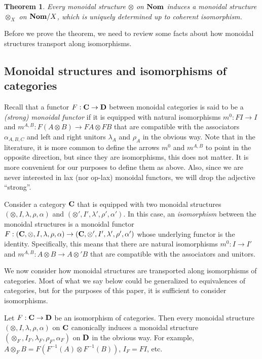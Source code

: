 \documentclass[11pt,a4paper]{amsart}
\theoremstyle{plain}
\newtheorem{xtheorem}{Theorem}[section]
\theoremstyle{definition}
\theoremstyle{remark}
\newcommand{\Nom}{\textrm{\bf Nom}}
\newcommand{\Cc}{\textrm{\bf{C}}}
\newcommand{\Dd}{\textrm{\bf{D}}}
\newcommand{\mm}{m}
\newcommand{\inv}{^{-1}}
\begin{document}
\begin{xtheorem}\label{thm:monoidal-nom-slash-x}
    Every monoidal structure $\otimes$ on $\Nom$ induces a
    monoidal structure $\otimes_X$ on $\Nom/X$, which is uniquely determined up to coherent isomorphism.
\end{xtheorem}


Before we prove the theorem, we need to review some facts about how
monoidal structures transport along isomorphisms.

\subsection{Monoidal structures and isomorphisms of categories}
\label{ssec:monoidal-iso-cats}

Recall that a functor $F:\Cc\to\Dd$ between monoidal categories is
said to be a {\em (strong) monoidal functor} if it is equipped with
natural isomorphisms $\mm^0 : FI\to I$ and $\mm^{A,B}:F(A\otimes B)\to
FA\otimes FB$ that are compatible with the associators $\alpha_{A,B,C}$ and left and right unitors
$\lambda_A$ and $\rho_A$ in
the obvious way. Note that in the literature, it is more common to
define the arrows $\mm^0$ and $\mm^{A,B}$ to point in the opposite
direction, but since they are isomorphisms, this does not matter. It
is more convenient for our purposes to define them as above. Also,
since we are never interested in lax (nor op-lax) monoidal functors,
we will drop the adjective ``strong''.

Consider a category $\Cc$ that is equipped with two monoidal
structures $(\otimes,I,\lambda,\rho,\alpha)$ and
$(\otimes',I',\lambda',\rho',\alpha')$. In this case, an
\emph{isomorphism} between the monoidal structures is a monoidal
functor $F:(\Cc,\otimes,I,\lambda,\rho,\alpha) \to
(\Cc,\otimes',I',\lambda',\rho',\alpha')$ whose underlying functor is
the identity. Specifically, this means that there are natural
isomorphisms $\mm^0 : I\to I'$ and $\mm^{A,B}:A\otimes B\to
A\otimes' B$ that are compatible with the associators and unitors.

We now consider how monoidal structures are transported along
isomorphisms of categories. Most of what we say below could be
generalized to equivalences of categories, but for the purposes of
this paper, it is sufficient to consider isomorphisms.

Let $F:\Cc\to\Dd$ be an isomorphism of categories. Then every monoidal
structure $(\otimes,I,\lambda,\rho,\alpha)$ on $\Cc$ canonically
induces a monoidal structure
$(\otimes_F,I_F,\lambda_F,\rho_F,\alpha_F)$ on $\Dd$ in the obvious
way. For example, $A\otimes_F B = F(F\inv(A)\otimes F\inv(B))$, $I_F =
FI$, etc.
\end{document}
